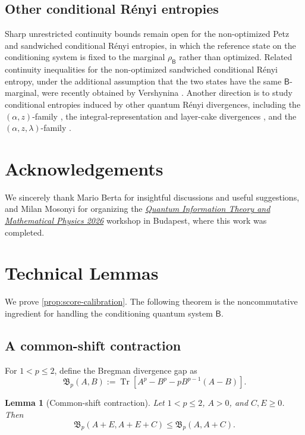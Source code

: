\documentclass[11pt,reqno]{amsart}
\newtheorem{lemma}[lemma]{Lemma}
\theoremstyle{definition}
\DeclareMathOperator{\Tr}{Tr}
\newcommand{\B}{\mathsf{B}}
\newcommand{\Breg}{\mathfrak{B}}
\begin{document}
\subsection{Other conditional R\'enyi entropies}
Sharp unrestricted continuity bounds remain open for the non-optimized
Petz and sandwiched conditional R\'enyi entropies, in which the reference
state on the conditioning system is fixed to the marginal
\(\rho_{\B}\) rather than optimized.
Related continuity inequalities for the non-optimized sandwiched
conditional R\'enyi entropy, under the additional assumption that the two
states have the same \(\B\)-marginal, were recently obtained by
Vershynina \cite{Vershynina26}.
Another direction is to study conditional entropies induced by other
quantum R\'enyi divergences, including the \((\alpha,z)\)-family
\cite{AD15}, the integral-representation and layer-cake divergences
\cite{hirche2023quantum,LHC25_layer_cake}, and the
\((\alpha,z,\lambda)\)-family \cite{rubboli2026quantum}.


\section*{Acknowledgements}
We sincerely thank Mario Berta for insightful discussions and useful suggestions, and Milan Mosonyi for organizing the \emph{\href{https://math.bme.hu/~mosonyi/QIMP2026/}{Quantum Information Theory and Mathematical Physics 2026}} workshop in Budapest, where this work was completed.


\appendix 


\section{Technical Lemmas}\label{sec:transport}

We prove \cref{prop:score-calibration}.  
The following theorem is the noncommutative ingredient for handling the conditioning quantum system $\B$.

\subsection{A common-shift contraction}

For $1<p\leq2$, define the Bregman divergence gap as
\begin{equation}\label{eq:Bregman-gap}
 \Breg_p(A,B)
 :=\Tr\!\left[A^p-B^p-pB^{p-1}(A-B)\right].
\end{equation}

\begin{lemma}[Common-shift contraction]\label{lem:common-shift}
Let $1<p\leq2$, $A>0$, and $C,E\geq0$.  Then
\begin{equation}\label{eq:common-shift}
 \Breg_p(A+E,A+E+C)
 \leq
 \Breg_p(A,A+C).
\end{equation}
\end{lemma}
\end{document}
